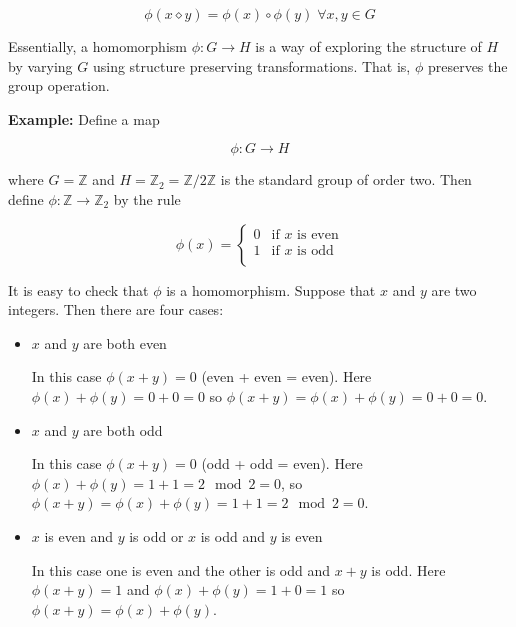 \documentclass{article}
\theoremstyle{definition}
\begin{document}
\medskip
\begin{equation*}
\phi(x \diamond y) = \phi(x) \circ \phi(y) \; \forall x,y \in G
\end{equation*}

\bigskip
\noindent
Essentially, a homomorphism $\phi: G \rightarrow H$ is a way of
exploring the structure of $H$ by varying $G$ using structure
preserving transformations. That is, $\phi$ preserves the group
operation.


\bigskip
\noindent
\textbf{Example:} Define a map

\begin{equation*}
\phi : G \rightarrow H
\end{equation*}

\bigskip
\noindent
where $G = \mathbb{Z}$ and $H = \mathbb{Z}_2 =
\mathbb{Z}/2\mathbb{Z}$ is the standard group of order two. Then
define $\phi: \mathbb{Z} \rightarrow \mathbb{Z}_2$ by the rule

\begin{equation*}
  \phi(x) =
    \begin{cases}
      0 & \text{if $x$ is even} \\
      1 & \text{if $x$ is odd}\\
    \end{cases}       
\end{equation*}

\bigskip
\noindent
It is easy to check that $\phi$ is a homomorphism. Suppose that
$x$ and $y$ are two integers. Then there are four cases:
\begin{itemize}
 \item $x$ and $y$ are both even
 
 In this case $\phi(x+y) = 0$ (even + even = even). Here
 $\phi(x)+\phi(y) = 0+0 = 0$ so $\phi(x+y) = \phi(x) + \phi(y) =
 0 + 0 = 0$.
 
 \item $x$ and $y$ are both odd
  
In this case $\phi(x+y) = 0$ (odd + odd = even).  Here $\phi(x) +
\phi(y) = 1 + 1 = 2 \mod 2 = 0$, so $\phi(x+y) = \phi(x) +
\phi(y) = 1 + 1 = 2 \mod 2 = 0$.

 \item $x$ is even and $y$ is odd or  $x$ is odd and  $y$ is even
 
In this case one is even and the other is odd and $x + y$ is odd.
Here $\phi(x+y) = 1$ and $\phi(x)+\phi(y) = 1+0 = 1$ so
$\phi(x+y) = \phi(x)+\phi(y)$.
 \end{itemize}
 
\end{document}
